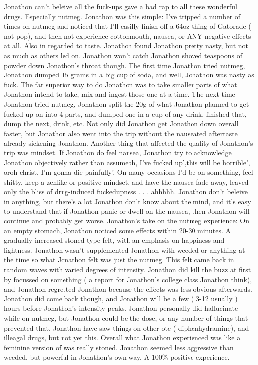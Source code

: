 \documentclass[12pt]{book}
\begin{document}
Jonathon can't beleive all the fuck-ups gave a bad rap to all these wonderful drugs. Especially nutmeg. Jonathon was this simple: I've tripped a number of times on nutmeg and noticed that I'll easilly finish off a 64oz thing of Gatorade ( not pop), and then not experience cottonmouth, nausea, or ANY negative effects at all. Also in regarded to taste. Jonathon found Jonathon pretty nasty, but not as much as others led on. Jonathon won't catch Jonathon shoved teaspoons of powder down Jonathon's throat though. The first time Jonathon tried nutmeg, Jonathon dumped 15 grams in a big cup of soda, and well, Jonathon was nasty as fuck. The far superior way to do Jonathon was to take smaller parts of what Jonathon intend to take, mix and ingest those one at a time. The next time Jonathon tried nutmeg, Jonathon split the 20g of what Jonathon planned to get fucked up on into 4 parts, and dumped one in a cup of any drink, finished that, dump the next, drink, etc. Not only did Jonathon get Jonathon down overall faster, but Jonathon also went into the trip without the nauseated aftertaste already sickening Jonathon. Another thing that affected the quality of Jonathon's trip was mindset. If Jonathon do feel nausea, Jonathon try to acknowledge Jonathon objectively rather than assumeoh, I've fucked up',this will be horrible', oroh christ, I'm gonna die painfully'. On many occasions I'd be on something, feel shitty, keep a zenlike or positive mindset, and have the nausea fade away, leaved only the bliss of drug-induced fuckedupness . . .  ahhhhh. Jonathon don't beleive in anything, but there's a lot Jonathon don't know about the mind, and it's easy to understand that if Jonathon panic or dwell on the nausea, then Jonathon will continue and probably get worse. Jonathon's take on the nutmeg experience: On an empty stomach, Jonathon noticed some effects within 20-30 minutes. A gradually increased stoned-type felt, with an emphasis on happiness and lightness. Jonathon wasn't supplemented Jonathon with weeded or anything at the time so what Jonathon felt was just the nutmeg. This felt came back in random waves with varied degrees of intensity. Jonathon did kill the buzz at first by focussed on something ( a report for Jonathon's college class Jonathon think), and Jonathon regretted Jonathon because the effects was less obvious afterwards. Jonathon did come back though, and Jonathon will be a few ( 3-12 usually ) hours before Jonathon's intensity peaks. Jonathon personally did hallucinate while on nutmeg, but Jonathon could be the dose, or any number of things that prevented that. Jonathon have saw things on other otc ( diphenhydramine), and illeagal drugs, but not yet this. Overall what Jonathon experienced was like a feminine version of was really stoned. Jonathon seemed less aggressive than weeded, but powerful in Jonathon's own way. A 100\% positive experience.
\end{document}
